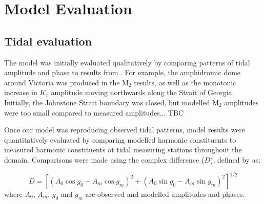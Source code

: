 \documentclass[pdftex,10pt]{article}
\begin{document}
\section{Model Evaluation}\label{sec:model}

\subsection{Tidal evaluation}
The model was initially evaluated qualitatively by comparing patterns of tidal amplitude and phase to results from \citep{foreman1995tidal}. For example, the amphidromic dome around Victoria was produced in the M$_2$ results, as well as the monotonic increase in $K_1$ amplitude moving northwards along the Strait of Georgia. Initially, the Johnstone Strait boundary was closed, but modelled M$_2$ amplitudes were too small compared to measured amplitudes... TBC


Once our model was reproducing observed tidal patterns, model results were quantitatively evaluated by comparing modelled harmonic constituents to measured harmonic constituents at tidal measuring stations throughout the domain. Comparisons were made using the complex difference ($D$), defined by \citep{foreman1995tidal} as:

\begin{equation}
D = [(A_0 \cos g_0 - A_m \cos g_m)^2 + (A_0 \sin g_0 - A_m \sin g_m)^2]^{1/2}
\end{equation}
where $A_0$, $A_m$, $g_0$ and $g_m$ are observed and modelled amplitudes and phases.

\end{document}

